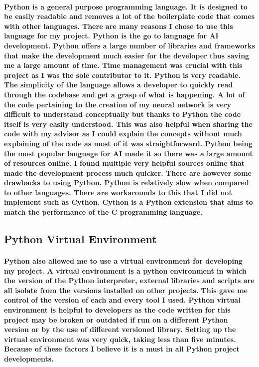 \paragraph{Python is a general purpose programming language. It is designed to be easily readable and removes a lot of the boilerplate code that comes with other languages. There are many reasons I chose to use this language for my project. Python is the go to language for AI development. Python offers a large number of libraries and frameworks that make the development much easier for the developer thus saving me a large amount of time. Time management was crucial with this project as I was the sole contributor to it. Python is very readable. The simplicity of the language allows a developer to quickly read through the codebase and get a grasp of what is happening. A lot of the code pertaining to the creation of my neural network is very difficult to understand conceptually but thanks to Python the code itself is very easily understood. This was also helpful when sharing the code with my advisor as I could explain the concepts without much explaining of the code as most of it was straightforward. Python being the most popular language for AI made it so there was a large amount of resources online. I found multiple very helpful sources online that made the development process much quicker. There are however some drawbacks to using Python. Python is relatively slow when compared to other languages. There are workarounds to this that I did not implement such as Cython\cite{cython}. Cython is a Python extension that aims to match the performance of the C programming language.}

\subsection{Python Virtual Environment}
\paragraph{Python also allowed me to use a virtual environment for developing my project. A virtual environment is a python environment in which the version of the Python interpreter, external libraries and scripts are all isolate from the versions installed on other projects. This gave me control of the version of each and every tool I used. Python virtual environment is helpful to developers as the code written for this project may be broken or outdated if run on a different Python version or by the use of different versioned library. Setting up the virtual environment was very quick, taking less than five minutes. Because of these factors I believe it is a must in all Python project developments. }

